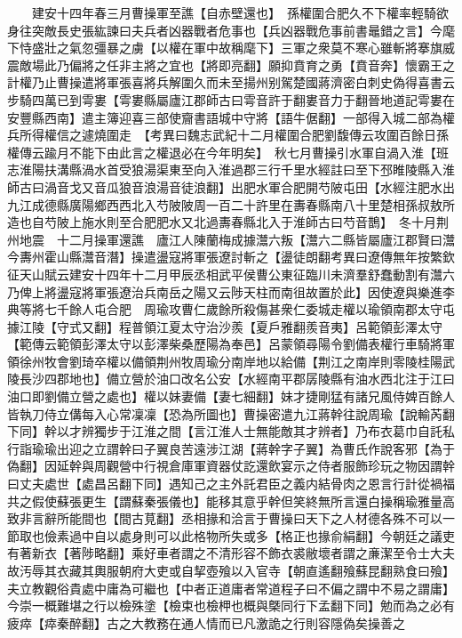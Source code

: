 　　建安十四年春三月曹操軍至譙【自赤壁還也】　孫權圍合肥久不下權率輕騎欲身往突敵長史張紘諫曰夫兵者凶器戰者危事也【兵凶器戰危事前書鼂錯之言】今麾下恃盛壯之氣忽彊暴之虜【以權在軍中故稱麾下】三軍之衆莫不寒心雖斬將搴旗威震敵場此乃偏將之任非主將之宜也【將即亮翻】願抑賁育之勇【賁音奔】懷霸王之計權乃止曹操遣將軍張喜將兵解圍久而未至揚州别駕楚國蔣濟密白刺史偽得喜書云步騎四萬已到雩婁【雩婁縣屬廬江郡師古曰雩音許于翻婁音力于翻晉地道記雩婁在安豐縣西南】遣主簿迎喜三部使齎書語城中守將【語牛倨翻】一部得入城二部為權兵所得權信之遽燒圍走　【考異曰魏志武紀十二月權圍合肥劉馥傳云攻圍百餘日孫權傳云踰月不能下由此言之權退必在今年明矣】　秋七月曹操引水軍自渦入淮【班志淮陽扶溝縣渦水首受狼湯渠東至向入淮過郡三行千里水經註曰至下邳睢陵縣入淮師古曰渦音戈又音瓜狼音浪湯音徒浪翻】出肥水軍合肥開芍陂屯田【水經注肥水出九江成德縣廣陽鄉西西北入芍陂陂周一百二十許里在夀春縣南八十里楚相孫叔敖所造也自芍陂上施水則至合肥肥水又北過夀春縣北入于淮師古曰芍音鵲】　冬十月荆州地震　十二月操軍還譙　廬江人陳蘭梅成據灊六叛【灊六二縣皆屬廬江郡賢曰灊今夀州霍山縣灊音潛】操遣盪寇將軍張遼討斬之【盪徒朗翻考異曰遼傳無年按繁欽征天山賦云建安十四年十二月甲辰丞相武平侯曹公東征臨川未濟羣舒蠢動割有灊六乃俾上將盪寇將軍張遼治兵南岳之陽又云陟天柱而南徂故置於此】因使遼與樂進李典等將七千餘人屯合肥　周瑜攻曹仁歲餘所殺傷甚衆仁委城走權以瑜領南郡太守屯據江陵【守式又翻】程普領江夏太守治沙羨【夏戶雅翻羨音夷】呂範領彭澤太守【範傳云範領彭澤太守以彭澤柴桑歷陽為奉邑】呂蒙領尋陽令劉備表權行車騎將軍領徐州牧會劉琦卒權以備領荆州牧周瑜分南岸地以給備【荆江之南岸則零陵桂陽武陵長沙四郡地也】備立營於油口改名公安【水經南平郡孱陵縣有油水西北注于江曰油口即劉備立營之處也】權以妹妻備【妻七細翻】妹才捷剛猛有諸兄風侍婢百餘人皆執刀侍立傋每入心常凜凜【恐為所圖也】曹操密遣九江蔣幹往說周瑜【說輸芮翻下同】幹以才辨獨步于江淮之間【言江淮人士無能敵其才辨者】乃布衣葛巾自託私行詣瑜瑜出迎之立謂幹曰子翼良苦遠涉江湖【蔣幹字子翼】為曹氏作說客邪【為于偽翻】因延幹與周觀營中行視倉庫軍資器仗訖還飲宴示之侍者服飾珍玩之物因謂幹曰丈夫處世【處昌呂翻下同】遇知己之主外託君臣之義内結骨肉之恩言行計從禍福共之假使蘇張更生【謂蘇秦張儀也】能移其意乎幹但笑終無所言還白操稱瑜雅量高致非言辭所能間也【間古莧翻】丞相掾和洽言于曹操曰天下之人材德各殊不可以一節取也儉素過中自以處身則可以此格物所失或多【格正也掾俞絹翻】今朝廷之議吏有著新衣【著陟略翻】乘好車者謂之不清形容不飾衣裘敝壞者謂之亷潔至令士大夫故汚辱其衣藏其輿服朝府大吏或自挈壺飱以入官寺【朝直遙翻飱蘇昆翻熟食曰飱】夫立教觀俗貴處中庸為可繼也【中者正道庸者常道程子曰不偏之謂中不易之謂庸】今崇一概難堪之行以檢殊塗【檢束也檢柙也概與槩同行下孟翻下同】勉而為之必有疲瘁【瘁秦醉翻】古之大教務在通人情而已凡激詭之行則容隱偽矣操善之

